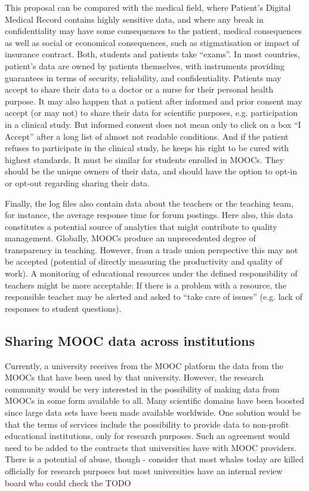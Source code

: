 This proposal can be compared with the medical field, where Patient's
Digital Medical Record contains highly sensitive data, and where any
break in confidentiality may have some consequences to the patient,
medical consequences as well as social or economical consequences, such
as stigmatisation or impact of insurance contract. Both, students and
patients take ``exams''. In most countries, patient's data are owned by
patients themselves, with instruments providing guarantees in terms of
security, reliability, and confidentiality. Patients may accept to share
their data to a doctor or a nurse for their personal health purpose. It
may also happen that a patient after informed and prior consent may
accept (or may not) to share their data for scientific purposes,
e.g. participation in a clinical study. But informed consent does not
mean only to click on a box ``I Accept'' after a long list of almost not
readable conditions. And if the patient refuses to participate in the
clinical study, he keeps his right to be cured with highest
standards. It must be similar for students enrolled in MOOCs. They
should be the unique owners of their data, and should have the option to
opt-in or opt-out regarding sharing their data.

Finally, the log files also contain data about the teachers or the
teaching team, for instance, the average response time for forum
postings. Here also, this data constitutes a potential source of
analytics that might contribute to quality management. Globally, MOOCs
produce an unprecedented degree of transparency in teaching. However,
from a trade union perspective this may not be accepted (potential of
directly measuring the productivity and quality of work). A monitoring
of educational resources under the defined responsibility of teachers
might be more acceptable: If there is a problem with a resource, the
responsible teacher may be alerted and asked to ``take care of issues''
(e.g. lack of responses to student questions).


\subsection{Sharing MOOC data across institutions}

Currently, a university receives from the MOOC platform the data from
the MOOCs that have been used by that university. However, the research
community would be very interested in the possibility of making data
from MOOCs in some form available to all. Many scientific domains have
been boosted since large data sets have been made available
worldwide. One solution would be that the terms of services include the
possibility to provide data to non-profit educational institutions, only
for research purposes. Such an agreement would need to be added to the
contracts that universities have with MOOC providers. There is a
potential of abuse, though - consider that most whales today are killed
officially for research purposes but most universities have an internal
review board who could check the TODO

